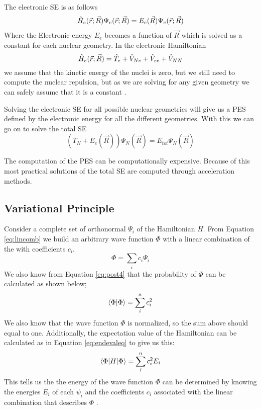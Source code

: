 \documentclass[../master_thesis.tex]{subfiles}
\begin{document}
The electronic \ac{SE} is as follows
\begin{equation}
    \hat{H}_e(\vec{r}; \vec{R})\Psi_e(\vec{r};\vec{R}) = E_e(\vec{R})\Psi_e(\vec{r};\vec{R})
\end{equation}
Where the Electronic energy $E_e$ becomes a function of $\vec{R}$ which is solved as
a constant for each nuclear geometry. In the electronic Hamiltonian
\begin{equation}
    \hat{H}_e(\vec{r}; \vec{R}) = \hat{T}_e + \hat{V}_{Ne} + \hat{V}_{ee} + \hat{V}_{NN}
\end{equation}
we assume that the kinetic energy of the nuclei is zero, but we still need to
compute the nuclear repulsion, but as we are solving for any given geometry we can
safely assume that it is a constant \cite{Cramer:2004}.

Solving the electronic \ac{SE} for all possible nuclear geometries will give us
a \ac{PES} defined by the electronic energy for all the different geometries.
With this we can go on to solve the total \ac{SE} \cite{Jensen:2017}
\begin{equation}
  (T_N + E_e(\vec{R}))\Psi_N(\vec{R}) = E_{tot}\Psi_N(\vec{R})
\end{equation}

The computation of the \ac{PES} can be computationally expensive. Because of this
most practical solutions of the total \ac{SE} are computed through acceleration
methods\cite{Jensen:2017}.


\subsection{Variational Principle}
Consider a complete set of orthonormal \eifuncs $ \Psi_i$  of the
Hamiltonian $H$. From Equation \ref{eq:lincomb} we build an arbitrary
wave function $\Phi$ with a linear combination of the \eifuncs with
coefficients $c_i$.
\begin{equation}
  \Phi = \sum\limits_ic_i\Psi_i
\end{equation}
We also know from Equation \ref{eq:post4} that the probability of $\Phi$ can
be calculated as shown below;
\begin{equation}
  \braket{\Phi|\Phi} = \sum\limits_i^nc_i^2
\end{equation}
We also know that the wave function $\Phi$ is normalized, so the sum above
should equal to one. Additionally, the expectation value of the Hamiltonian can
be calculated as in Equation \ref{eq:endevaleq} to give us this:
\begin{equation}
  \braket{\Phi|H|\Phi} = \sum\limits_i^nc_i^2E_i\label{eq:genenerg}
\end{equation}
This tells us the the energy of the wave function $\Phi$ can be determined by
knowing the energies $E_i$ of each \eifunc $\psi_i$ and the coefficients
$c_i$ associated with the linear combination that describes $\Phi$
\cite{Cramer:2004}.
\end{document}
